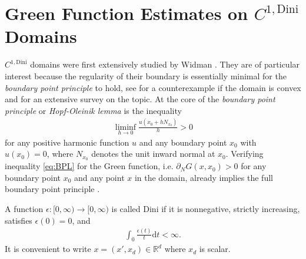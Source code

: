 \documentclass[a4paper,12pt]{article}
\theoremstyle{definition}
\theoremstyle{definition}
\begin{document}
	\section{Green Function Estimates on $C^{1,\mathrm{Dini}}$ Domains}\label{sec:GreenEstimates}
	$C^{1,\mathrm{Dini}}$ domains were first extensively studied by Widman \cite{Widmann67}. They are of particular interest because the regularity of their boundary is essentially minimal for the \textit{boundary point principle} to hold, see \cite{ApuNaz16} for a counterexample if the domain is convex and \cite{ApuNaz22} for an extensive survey on the topic. At the core of the \textit{boundary point principle} or \textit{Hopf-Oleinik lemma} is the inequality
	\begin{align}\label{eq:BPL}
		\liminf_{h\rightarrow0}\frac{u(x_0+hN_{x_0})}{h}>0
	\end{align}
	for any positive harmonic function $u$ and any boundary point $x_0$ with $u(x_0)=0$, where $N_{x_0}$ denotes the unit inward normal at $x_0$. Verifying inequality \eqref{eq:BPL} for the Green function, i.e. $\partial_N G(x,x_0)>0$ for any boundary point $x_0$ and any point $x$ in the domain, already implies the full boundary point principle \cite{ApuNaz22}.\par
	A function $\epsilon:[0,\infty)\rightarrow[0,\infty)$ is called Dini if it is nonnegative, strictly increasing, satisfies $\epsilon(0)=0$, and 
	\begin{align}
		\int_0\frac{\epsilon(t)}{t}\mathrm dt<\infty.
	\end{align}
 	It is convenient to write $x=(x',x_d)\in\mathbb R^d$ where $x_d$ is scalar.
 	
\end{document}
